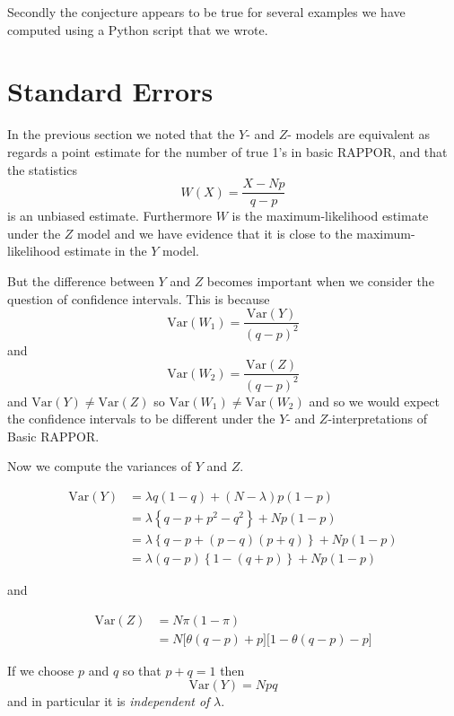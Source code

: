 \documentclass[oneside,12pt]{amsart}
\begin{document}
Secondly the conjecture appears to be true for several examples we have
computed using a Python script that we wrote.



\section{Standard Errors}

In the previous section we noted that the $Y$- and $Z$- models are equivalent
as regards a point estimate for the number of true 1's in basic RAPPOR,
and that the statistics
$$W(X) = \frac{X-N p}{q-p}$$
is an unbiased estimate. Furthermore $W$ is the maximum-likelihood estimate
under the $Z$ model and we have evidence that it is close to the maximum-likelihood
estimate in the $Y$ model.

But the difference between $Y$ and $Z$ becomes important when we consider
the question of confidence intervals. This is because
$$\text{Var}(W_1) = \frac{\text{Var}(Y)}{(q-p)^2}$$
and
$$\text{Var}(W_2) = \frac{\text{Var}(Z)}{(q-p)^2}$$
and
$\text{Var}(Y)\not=\text{Var}(Z)$ so $\text{Var}(W_1)\not=\text{Var}(W_2)$
and so we would expect the confidence intervals to be different under
the $Y$- and $Z$-interpretations of Basic RAPPOR.

Now we compute the variances of $Y$ and $Z$.

\begin{equation}
\begin{split}
\text{Var}(Y) &= \lambda q (1-q) + (N-\lambda) p (1 - p) \\
 & = \lambda\left \{ q-p+p^2-q^2\right \} + N p (1 - p) \\
 & = \lambda\left \{ q-p+(p-q)(p+q)\right \} + N p (1 - p) \\
 & = \lambda (q-p) \left \{ 1-(q+p) \right \} + N p (1 - p)
\end{split}
\end{equation}

and

\begin{equation}
\begin{split}
\text{Var}(Z) &= N \pi (1 - \pi) \\
 & = N \bigl[\theta(q-p) + p \bigr] \bigl[1 - \theta(q-p) - p \bigr]
\end{split}
\end{equation}

\begin{remark}
If we choose $p$ and $q$ so that $p+q = 1$ then
$$\text{Var}(Y) = N p q$$
and in particular it is \emph{independent of} $\lambda$.
\end{remark}
\end{document}
